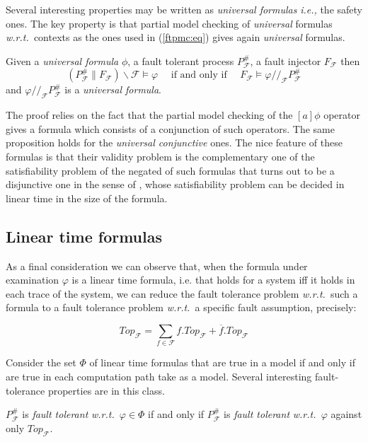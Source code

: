 \documentclass{entcs}
\newcommand{\ie}{\emph{i.e., }}
\newcommand{\wrt}{\emph{w.r.t.~}}
\newcommand{\quotres}[2]{\slash\!\!\slash_{#1} #2}
\newcommand{\mycomp}[1]{\overline{#1}}
\newcommand{\Faults}{\mathcal{F}}
\newcommand{\faulttolerant}[1]{{#1}^{\#}_\Faults}
\newcommand{\res}{\backslash}
\newcommand{\sat}{\models}
\begin{document}
Several interesting properties may be written as {\em universal
formulas} \ie the safety ones.  The key property is that partial model
checking of {\em universal} formulas \wrt contexts as the ones used in
(\ref{ftpmc:eq}) gives again {\em universal} formulas.
%
\begin{proposition}
Given a {\em universal formula} $\phi$, a fault
tolerant process $\faulttolerant{P}$, a fault injector $F_\Faults$
then
%
$$(\faulttolerant{P} \parallel F_\Faults) \res \Faults \sat
\varphi \quad \mbox{ if and only if } \quad  F_\Faults\models \varphi\quotres{\Faults}{\faulttolerant{P}}
$$
%
and $\varphi\quotres{\Faults}{\faulttolerant{P}}$ is a {\em universal formula}.
\end{proposition}%

The proof relies on the fact that the partial model checking of the
$[a]\phi$ operator gives a formula which consists of a conjunction of
such operators.  The same proposition holds for the {\em universal
conjunctive} ones. The nice feature of these formulas is that their
validity problem is the complementary one of the satisfiability problem of the
negated of such formulas that turns out to be a disjunctive one in the
sense of \cite{JW:autmcr}, whose satisfiability problem can be decided
in linear time in the size of the formula.

\subsection{Linear time formulas}
As a final consideration we can observe that, when the formula under
examination $\varphi$ is a linear time formula, i.e. that holds for a system iff it holds
in each trace of the system, we can reduce the fault tolerance problem
\wrt such a formula to a fault tolerance problem \wrt a specific fault
assumption, precisely:

$$ Top_{\Faults} = \sum_{f\in \Faults} f.Top_{\Faults} +
\mycomp{f}.Top_{\Faults} $$%

Consider the set $\Phi$ of linear time formulas that are
true in a model if and only if are true in each computation path take
as a model. Several interesting fault-tolerance properties are in this
class.

\begin{proposition}
\label{top:pro}
$\faulttolerant{P}$ is {\em fault tolerant} \wrt $\varphi \in \Phi$ if
and only if $\faulttolerant{P}$ is {\em fault tolerant} \wrt $\varphi$
against only $Top_{\Faults}$.
\end{proposition}%
\end{document}
